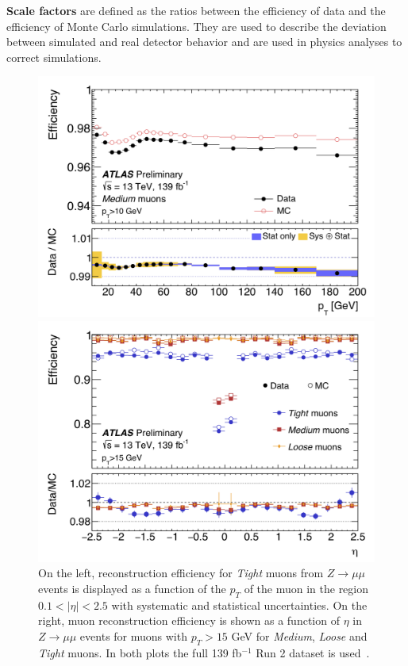 \textbf{Scale factors} are defined as the ratios between the efficiency of data and the efficiency of Monte Carlo simulations. They are used to describe the deviation between simulated and real detector behavior and are used in physics analyses to correct simulations. 
\begin{figure}[!h]
  \centering
  \begin{minipage}[b]{0.45\textwidth}
    \includegraphics[width=\textwidth]{Pictures/efficiencyoverpt.PNG}
  \end{minipage}
  \hspace{.5cm}
  \begin{minipage}[b]{0.45\textwidth}
    \includegraphics[width=\textwidth]{Pictures/efficiencyovereta.PNG}
  \end{minipage}
  \caption{On the left, reconstruction efficiency for \textit{Tight} muons from $Z \rightarrow \mu\mu$ events is displayed as a function of the $p_T$ of the muon in the region $0.1 < |\eta| < 2.5$ with systematic and statistical uncertainties.  On the right, muon reconstruction efficiency is shown as a function of $\eta$ in $Z \rightarrow \mu\mu$ events for muons with $p_T > 15$ GeV for \textit{Medium}, \textit{Loose} and \textit{Tight} muons. In both plots the full 139 fb$^{-1}$ Run 2 dataset is used~\cite{MCPPlots}.}
  \label{fig:efficiency}
\end{figure}

